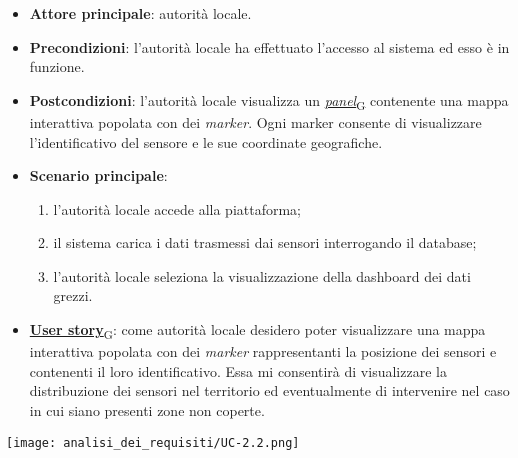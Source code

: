 \begin{itemize}
	\item \textbf{Attore principale}: autorità locale.
	\item \textbf{Precondizioni}: l'autorità locale ha effettuato l'accesso al sistema ed esso è in funzione.
	\item \textbf{Postcondizioni}: l'autorità locale visualizza un \href{https://7last.github.io/docs/pb/documentazione-interna/glossario\#panel}{\textit{panel}\textsubscript{G}} contenente una mappa interattiva
	      popolata con dei \textit{marker}. Ogni marker consente di visualizzare l'identificativo del sensore e le sue coordinate geografiche.
	\item \textbf{Scenario principale}:
	      \begin{enumerate}
		      \item l'autorità locale accede alla piattaforma;
		      \item il sistema carica i dati trasmessi dai sensori interrogando il database;
		      \item l'autorità locale seleziona la visualizzazione della dashboard dei dati grezzi.
	      \end{enumerate}
	\item \href{https://7last.github.io/docs/pb/documentazione-interna/glossario\#user-story}{\textbf{User story}\textsubscript{G}}: come autorità locale desidero poter visualizzare una mappa interattiva popolata con dei \textit{marker} rappresentanti
	      la posizione dei sensori e contenenti il loro identificativo. Essa mi consentirà di visualizzare la distribuzione dei sensori nel territorio
	      ed eventualmente di intervenire nel caso in cui siano presenti zone non coperte.
\end{itemize}
\begin{center}
	\texttt{[image: analisi\_dei\_requisiti/UC-2.2.png]}
\end{center}


